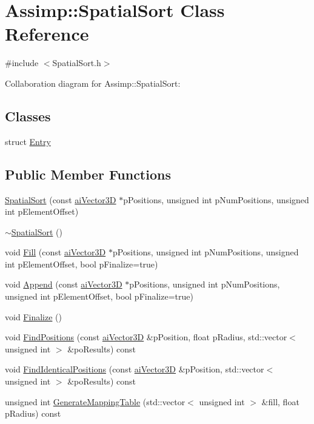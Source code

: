 \hypertarget{class_assimp_1_1_spatial_sort}{\section{Assimp\+:\+:Spatial\+Sort Class Reference}
\label{class_assimp_1_1_spatial_sort}
}


{\ttfamily \#include $<$Spatial\+Sort.\+h$>$}



Collaboration diagram for Assimp\+:\+:Spatial\+Sort\+:
\subsection*{Classes}
\begin{DoxyCompactItemize}
\item 
struct \hyperlink{struct_assimp_1_1_spatial_sort_1_1_entry}{Entry}
\end{DoxyCompactItemize}
\subsection*{Public Member Functions}
\begin{DoxyCompactItemize}
\item 
\hyperlink{class_assimp_1_1_spatial_sort_a5f2d83525c94a943f38450e4fa9da3e9}{Spatial\+Sort} (const \hyperlink{structai_vector3_d}{ai\+Vector3\+D} $\ast$p\+Positions, unsigned int p\+Num\+Positions, unsigned int p\+Element\+Offset)
\item 
\hyperlink{class_assimp_1_1_spatial_sort_a77fc422f8682caa48a54f89d3110cca8}{$\sim$\+Spatial\+Sort} ()
\item 
void \hyperlink{class_assimp_1_1_spatial_sort_a9818ff67761742c6492173e61035ad37}{Fill} (const \hyperlink{structai_vector3_d}{ai\+Vector3\+D} $\ast$p\+Positions, unsigned int p\+Num\+Positions, unsigned int p\+Element\+Offset, bool p\+Finalize=true)
\item 
void \hyperlink{class_assimp_1_1_spatial_sort_acc7813f0ab385e7744890b92f12c8fd8}{Append} (const \hyperlink{structai_vector3_d}{ai\+Vector3\+D} $\ast$p\+Positions, unsigned int p\+Num\+Positions, unsigned int p\+Element\+Offset, bool p\+Finalize=true)
\item 
void \hyperlink{class_assimp_1_1_spatial_sort_a28ddec1cbbce9f157dd1457f5f7f07d4}{Finalize} ()
\item 
void \hyperlink{class_assimp_1_1_spatial_sort_aba82319700683c65857deaffc245e3c7}{Find\+Positions} (const \hyperlink{structai_vector3_d}{ai\+Vector3\+D} \&p\+Position, float p\+Radius, std\+::vector$<$ unsigned int $>$ \&po\+Results) const 
\item 
void \hyperlink{class_assimp_1_1_spatial_sort_a7ea3522c3964aa1640fb321fc5b8b449}{Find\+Identical\+Positions} (const \hyperlink{structai_vector3_d}{ai\+Vector3\+D} \&p\+Position, std\+::vector$<$ unsigned int $>$ \&po\+Results) const 
\item 
unsigned int \hyperlink{class_assimp_1_1_spatial_sort_ab09199a44c54f4f98ad83bb2dd377623}{Generate\+Mapping\+Table} (std\+::vector$<$ unsigned int $>$ \&fill, float p\+Radius) const 
\end{DoxyCompactItemize}

